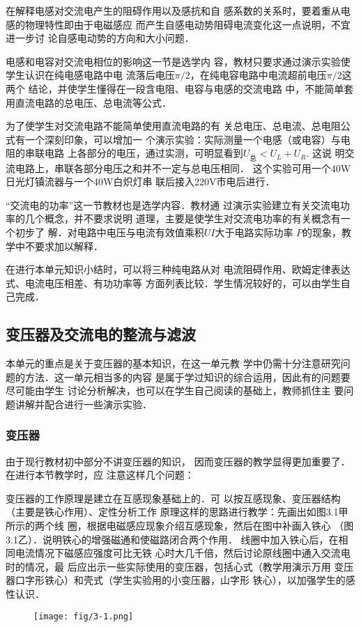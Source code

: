 在解释电感对交流电产生的阻碍作用以及感抗和自
感系数的关系时，要着重从电感的物理特性即由于电磁感应
而产生自感电动势阻碍电流变化这一点说明，不宜进一步讨
论自感电动势的方向和大小问题．

电感和电容对交流电相位的影响这一节是选学内
容，教材只要求通过演示实验使学生认识在纯电感电路中电
流落后电压$\pi/2$，在纯电容电路中电流超前电压$\pi/2$这两个
结论，并使学生懂得在一段含电阻、电容与电感的交流电路
中，不能简单套用直流电路的总电压、总电流等公式．

为了使学生对交流电路不能简单使用直流电路的有
关总电压、总电流、总电阻公式有一个深刻印象，可以增加一
个演示实验：实际测量一个电感（或电容）与电阻的串联电路
上各部分的电压，通过实测，可明显看到$U_{\text{总}}<U_L+U_R$. 这说
明交流电路上，串联各部分电压之和并不一定与总电压相同．
这个实验可用一个40W日光灯镇流器与一个40W白炽灯串
联后接入220V市电后进行．

“交流电的功率”这一节教材也是选学内容．教材通
过演示实验建立有关交流电功率的几个概念，并不要求说明
道理，主要是使学生对交流电功率的有关概念有一个初步了
解．对电路中电压与电流有效值乘积$UI$大于电路实际功率
$P$的现象，教学中不要求加以解释．

在进行本单元知识小结时，可以将三种纯电路从对
电流阻碍作用、欧姆定律表达式、电流电压相差、有功功率等
方面列表比较．学生情况较好的，可以由学生自己完成．


\subsection{变压器及交流电的整流与滤波}
本单元的重点是关于变压器的基本知识，在这一单元教
学中仍需十分注意研究问题的方法．这一单元相当多的内容
是属于学过知识的综合运用，因此有的问题要尽可能由学生
讨论分析解决，也可以在学生自己阅读的基础上，教师抓住主
要问题讲解并配合进行一些演示实验．

\subsubsection{变压器}
由于现行教材初中部分不讲变压器的知识，
因而变压器的教学显得更加重要了．在进行本节教学时，应
注意这样几个问题：

变压器的工作原理是建立在互感现象基础上的．可
以按互感现象、变压器结构（主要是铁心作用）、定性分析工作
原理这样的思路进行教学：先画出如图3.1甲所示的两个线
圈，根据电磁感应现象介绍互感现象，然后在图中补画入铁心
（图3.1乙）．说明铁心的增强磁通和使磁路闭合两个作用．
线圈中加入铁心后，在相同电流情况下磁感应强度可比无铁
心时大几千倍，然后讨论原线圈中通入交流电时的情况，最
后应出示一些实际使用的变压器，包括心式（教学用演示万用
变压器口字形铁心）和壳式（学生实验用的小变压器，山字形
铁心），以加强学生的感性认识．
\begin{figure}[htp]
    \centering
\texttt{[image: fig/3-1.png]}
    \caption{}
\end{figure}

